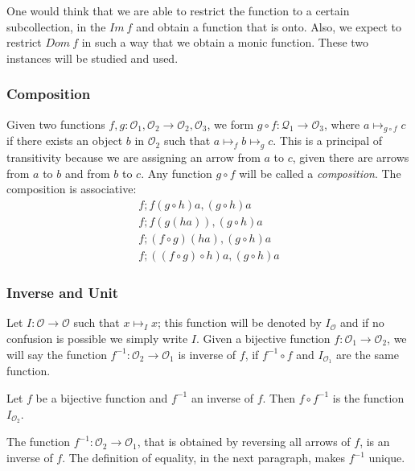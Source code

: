 \documentclass [12pt]{book}
\begin{document}
One would think that we are able to restrict the function to a certain subcollection, in the $Im~f$ and obtain a function that is onto. Also, we expect to restrict $Dom~f$ in such a way that we obtain a monic function. These two instances will be studied and used.

\subsubsection{Composition} Given two functions $f,g:\mathcal{O}_{1},\mathcal{O}_{2}\rightarrow\mathcal{O}_{2},\mathcal{O}_{3}$, we form $g\circ f:\mathcal{Q}_{1}\rightarrow\mathcal{O}_{3}$, where $a\mapsto_{g\circ f}c$ if there exists an object $b$ in $\mathcal{O}_{2}$ such that $a\mapsto_{f}b\mapsto_{g}c$. This is a principal of transitivity because we are assigning an arrow from $a$ to $c$, given there are arrows from $a$ to $b$ and from $b$ to $c$. Any function $g\circ f$ will be called a \textit{composition}. The composition is associative:\begin{eqnarray}\nonumber f;f(g\circ h)a,(g\circ h)a\\\nonumber f;f(g(ha)),(g\circ h)a\\\nonumber f;(f\circ g)(ha),(g\circ h)a\\\nonumber f;((f\circ g)\circ h)a,(g\circ h)a\end{eqnarray}

\subsubsection{Inverse and Unit}Let $I:\mathcal O\rightarrow\mathcal O$ such that $x\mapsto_I x$; this function will be denoted by $I_\mathcal O$ and if no confusion is possible we simply write $I$. Given a bijective function $f:\mathcal{O}_{1}\rightarrow\mathcal{O}_{2}$, we will say the function $f^{-1}:\mathcal{O}_{2}\rightarrow\mathcal{O}_{1}$ is inverse of $f$, if $f^{-1}\circ  f$ and $I_{\mathcal{O}_{1}}$ are the same function. 

\begin{proposition}Let $f$ be a bijective function and $f^{-1}$ an inverse of $f$. Then $f\circ f^{-1}$ is the function $I_{\mathcal O_2}$.

The function $f^{-1}:\mathcal O_2\rightarrow\mathcal O_1$, that is obtained by reversing all arrows of $f$, is an inverse of $f$. The definition of equality, in the next paragraph, makes $f^{-1}$ unique.\end{proposition}
\end{document}
